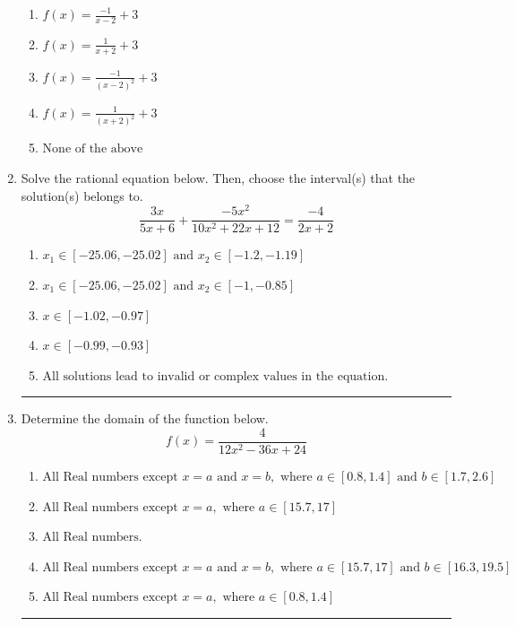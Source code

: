 \documentclass[14pt]{extbook}
\newcommand{\litem}[1]{\item#1\hspace*{-1cm}\rule{\textwidth}{0.4pt}}
\begin{document}
\begin{enumerate}
{\begin{center}
\end{center}
\begin{enumerate}[label=\Alph*.]
\item \( f(x) = \frac{-1}{x - 2} + 3 \)
\item \( f(x) = \frac{1}{x + 2} + 3 \)
\item \( f(x) = \frac{-1}{(x - 2)^2} + 3 \)
\item \( f(x) = \frac{1}{(x + 2)^2} + 3 \)
\item \( \text{None of the above} \)

\end{enumerate} }
\litem{
Solve the rational equation below. Then, choose the interval(s) that the solution(s) belongs to.\[ \frac{3x}{5x + 6} + \frac{-5x^{2}}{10x^{2} +22 x + 12} = \frac{-4}{2x + 2} \]\begin{enumerate}[label=\Alph*.]
\item \( x_1 \in [-25.06, -25.02] \text{ and } x_2 \in [-1.2,-1.19] \)
\item \( x_1 \in [-25.06, -25.02] \text{ and } x_2 \in [-1,-0.85] \)
\item \( x \in [-1.02,-0.97] \)
\item \( x \in [-0.99,-0.93] \)
\item \( \text{All solutions lead to invalid or complex values in the equation.} \)

\end{enumerate} }
\litem{
Determine the domain of the function below.\[ f(x) = \frac{4}{12x^{2} -36 x + 24} \]\begin{enumerate}[label=\Alph*.]
\item \( \text{All Real numbers except } x = a \text{ and } x = b, \text{ where } a \in [0.8, 1.4] \text{ and } b \in [1.7, 2.6] \)
\item \( \text{All Real numbers except } x = a, \text{ where } a \in [15.7, 17] \)
\item \( \text{All Real numbers.} \)
\item \( \text{All Real numbers except } x = a \text{ and } x = b, \text{ where } a \in [15.7, 17] \text{ and } b \in [16.3, 19.5] \)
\item \( \text{All Real numbers except } x = a, \text{ where } a \in [0.8, 1.4] \)


\end{enumerate}}
\end{enumerate}
\end{document}
